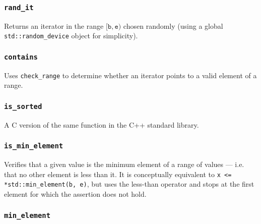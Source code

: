 \subsubsection{\texttt{rand\_it}}

Returns an iterator in the range $[\texttt{b}, \texttt{e})$ chosen randomly
(using a global \texttt{std::random\_device} object for simplicity).


\vspace{-\baselineskip}

\subsubsection{\texttt{contains}}

Uses \texttt{check\_range} to determine whether an iterator points to a valid
element of a range.


\vspace{-\baselineskip}

\subsubsection{\texttt{is\_sorted}}

A C version of the same function in the C++ standard library.


\vspace{-\baselineskip}

\subsubsection{\texttt{is\_min\_element}}

Verifies that a given value is the minimum element of a range of values --- i.e.
that no other element is less than it.  It is conceptually equivalent to
\texttt{x <= *std::min\_element(b, e)}, but uses the less-than operator and
stops at the first element for which the assertion does not hold.


\vspace{-\baselineskip}

\subsubsection{\texttt{min\_element}}


